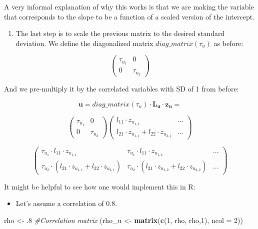 \documentclass[12pt,]{krantz}
\newenvironment{Shaded}{\begin{snugshade}}{\end{snugshade}}
\newcommand{\KeywordTok}[1]{\textcolor[rgb]{0.13,0.29,0.53}{\textbf{#1}}}
\newcommand{\DataTypeTok}[1]{\textcolor[rgb]{0.13,0.29,0.53}{#1}}
\newcommand{\DecValTok}[1]{\textcolor[rgb]{0.00,0.00,0.81}{#1}}
\newcommand{\FloatTok}[1]{\textcolor[rgb]{0.00,0.00,0.81}{#1}}
\newcommand{\StringTok}[1]{\textcolor[rgb]{0.31,0.60,0.02}{#1}}
\newcommand{\CommentTok}[1]{\textcolor[rgb]{0.56,0.35,0.01}{\textit{#1}}}
\newcommand{\NormalTok}[1]{#1}
\providecommand{\tightlist}{%
  \setlength{\itemsep}{0pt}\setlength{\parskip}{0pt}}
\theoremstyle{definition}
\theoremstyle{definition}
\theoremstyle{definition}
\theoremstyle{remark}
\begin{document}
A very informal explanation of why this works is that we are making the
variable that corresponds to the slope to be a function of a scaled
version of the intercept.

\begin{enumerate}
\def\labelenumi{\arabic{enumi}.}
\setcounter{enumi}{2}
\tightlist
\item
  The last step is to scale the previous matrix to the desired standard
  deviation. We define the diagonalized matrix \(diag\_matrix(\tau_u)\)
  as before:
\end{enumerate}

\[
  {\begin{pmatrix} 
  \tau_{u_1} & 0 \\ 
  0  & \tau_{u_2}
  \end{pmatrix}}
  \]

And we pre-multiply it by the correlated variables with SD of 1 from
before:

\[\mathbf{u} = diag\_matrix(\tau_u) \cdot \mathbf{L_u}\cdot \mathbf{z_u} = \]

\[ 
  {\begin{pmatrix} 
  \tau_{u_1} & 0 \\ 
  0  & \tau_{u_2}
  \end{pmatrix}}
  {\begin{pmatrix}
  l_{11} \cdot z_{u_{1,1}}  & ...  \\
  l_{21} \cdot z_{u_{1,1}} + l_{22} \cdot z_{u_{2,1}} & ... 
  \end{pmatrix}}
  \]

\[ 
  {\begin{pmatrix}
  \tau_{u_1} \cdot l_{11} \cdot z_{u_{1,1}}  & \tau_{u_1} \cdot l_{11} \cdot  z_{u_{1,2}} & ...  \\
  \tau_{u_2} \cdot (l_{21} \cdot z_{u_{1,1}} + l_{22} \cdot z_{u_{2,1}}) & \tau_{u_2} \cdot (l_{21} \cdot  z_{u_{1,2}} + l_{22} \cdot z_{u_{2,2}}) & ... 
  \end{pmatrix}}
  \]

It might be helpful to see how one would implement this in R:

\begin{itemize}
\tightlist
\item
  Let's assume a correlation of \(0.8\).
\end{itemize}

\begin{Shaded}
\begin{Highlighting}[]
\NormalTok{rho <-}\StringTok{ }\FloatTok{.8}
\CommentTok{#Correlation matrix}
\NormalTok{(rho_u <-}\StringTok{ }\KeywordTok{matrix}\NormalTok{(}\KeywordTok{c}\NormalTok{(}\DecValTok{1}\NormalTok{, rho, rho,}\DecValTok{1}\NormalTok{), }\DataTypeTok{ncol =} \DecValTok{2}\NormalTok{))}
\end{Highlighting}
\end{Shaded}
\end{document}
